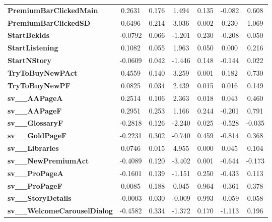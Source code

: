 \documentclass{report}
\begin{document}
\begin{center}
\begin{tabular}{lcccccc}
\textbf{PremiumBarClickedMain}       &       0.2631  &        0.176     &     1.494  &         0.135        &       -0.082    &        0.608     \\
\textbf{PremiumBarClickedSD}         &       0.6496  &        0.214     &     3.036  &         0.002        &        0.230    &        1.069     \\
\textbf{StartBekids}                 &      -0.0792  &        0.066     &    -1.201  &         0.230        &       -0.208    &        0.050     \\
\textbf{StartListening}              &       0.1082  &        0.055     &     1.963  &         0.050        &        0.000    &        0.216     \\
\textbf{StartNStory}                 &      -0.0609  &        0.042     &    -1.446  &         0.148        &       -0.144    &        0.022     \\
\textbf{TryToBuyNewPAct}             &       0.4559  &        0.140     &     3.259  &         0.001        &        0.182    &        0.730     \\
\textbf{TryToBuyNewPF}               &       0.0825  &        0.034     &     2.439  &         0.015        &        0.016    &        0.149     \\
\textbf{sv\_\_AAPageA}               &       0.2514  &        0.106     &     2.363  &         0.018        &        0.043    &        0.460     \\
\textbf{sv\_\_AAPageF}               &       0.2951  &        0.253     &     1.166  &         0.244        &       -0.201    &        0.791     \\
\textbf{sv\_\_GlossaryF}             &      -0.2818  &        0.126     &    -2.240  &         0.025        &       -0.528    &       -0.035     \\
\textbf{sv\_\_GoldPageF}             &      -0.2231  &        0.302     &    -0.740  &         0.459        &       -0.814    &        0.368     \\
\textbf{sv\_\_Libraries}             &       0.0746  &        0.015     &     4.955  &         0.000        &        0.045    &        0.104     \\
\textbf{sv\_\_NewPremiumAct}         &      -0.4089  &        0.120     &    -3.402  &         0.001        &       -0.644    &       -0.173     \\
\textbf{sv\_\_ProPageA}              &      -0.1601  &        0.139     &    -1.151  &         0.250        &       -0.433    &        0.113     \\
\textbf{sv\_\_ProPageF}              &       0.0085  &        0.188     &     0.045  &         0.964        &       -0.361    &        0.378     \\
\textbf{sv\_\_StoryDetails}          &      -0.0003  &        0.030     &    -0.009  &         0.993        &       -0.059    &        0.058     \\
\textbf{sv\_\_WelcomeCarouselDialog} &      -0.4582  &        0.334     &    -1.372  &         0.170        &       -1.113    &        0.196     \\
\bottomrule
\end{tabular}
\end{center}
\end{document}
